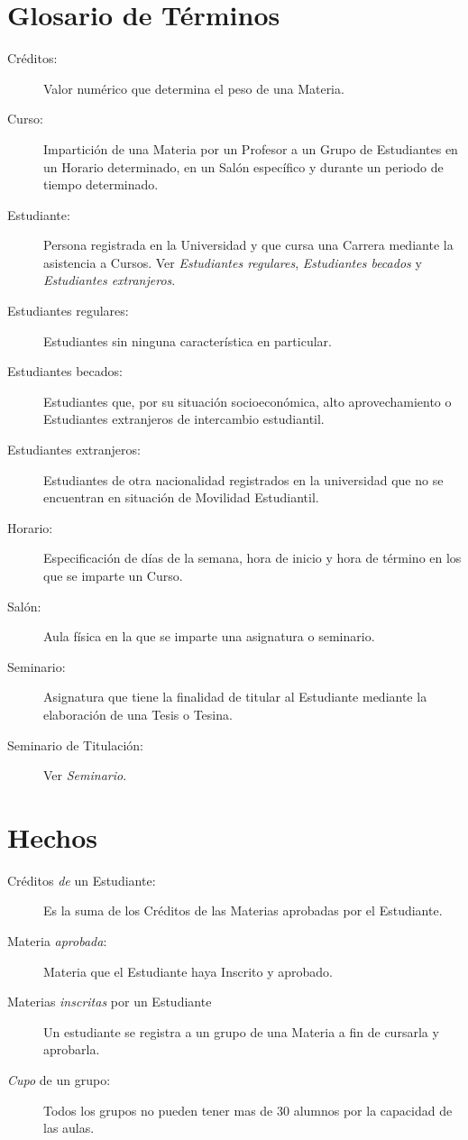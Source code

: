 \section{Glosario de Términos}

\begin{description}
	\item[Créditos:] Valor numérico que determina el peso de una Materia.
	\item[Curso:] Impartición de una Materia por un Profesor a un Grupo de Estudiantes en un Horario determinado, en un Salón específico y durante un periodo de tiempo determinado.
	\item[Estudiante:] Persona registrada en la Universidad y que cursa una Carrera mediante la asistencia a Cursos. Ver {\em Estudiantes regulares}, {\em Estudiantes becados} y {\em Estudiantes extranjeros}.
	\item[Estudiantes regulares:] Estudiantes sin ninguna característica en particular.
	\item[Estudiantes becados:] Estudiantes que, por su situación socioeconómica, alto aprovechamiento o Estudiantes extranjeros de intercambio estudiantil.
	\item[Estudiantes extranjeros:] Estudiantes de otra nacionalidad registrados en la universidad que no se encuentran en situación de Movilidad Estudiantil.
	\item[Horario:] Especificación de días de la semana, hora de inicio y hora de término en los que se imparte un Curso.
	\item[Salón:] Aula física en la que se imparte una asignatura o seminario.
	\item[Seminario:] Asignatura que tiene la finalidad de titular al Estudiante mediante la elaboración de una Tesis o Tesina.
	\item[Seminario de Titulación:] Ver {\em Seminario}.
\end{description}

\section{Hechos}

\begin{description}
	\item[Créditos {\em de} un Estudiante:] Es la suma de los Créditos de las Materias aprobadas por el Estudiante.
	\item[Materia {\em aprobada}:] Materia que el Estudiante haya Inscrito y aprobado.
	\item[Materias {\em inscritas} por un Estudiante] Un estudiante se registra a un grupo de una Materia a fin de cursarla y aprobarla.
	\item[{\em Cupo} de un grupo:] Todos los grupos no pueden tener mas de 30 alumnos por la capacidad de las aulas.
\end{description}





